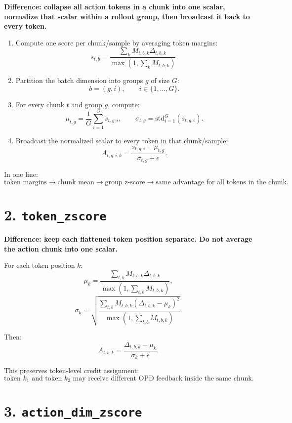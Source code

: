 \documentclass[10pt]{article}
\newcommand{\Diff}[1]{\textcolor{DiffBlue}{\textbf{#1}}}
\newcommand{\code}[1]{\texttt{#1}}
\newcommand{\Margin}{\Delta}
\newcommand{\Mask}{M}
\newcommand{\Adv}{A}
\begin{document}
\Diff{Difference: collapse all action tokens in a chunk into one scalar, normalize
that scalar within a rollout group, then broadcast it back to every token.}

\begin{enumerate}
  \item Compute one score per chunk/sample by averaging token margins:
  \[
    s_{t,b}
    =
    \frac{\sum_k \Mask_{t,b,k}\Margin_{t,b,k}}
         {\max\left(1,\sum_k \Mask_{t,b,k}\right)}.
  \]

  \item Partition the batch dimension into groups $g$ of size $G$:
  \[
    b=(g,i), \qquad i\in\{1,\ldots,G\}.
  \]

  \item For every chunk $t$ and group $g$, compute:
  \[
    \mu_{t,g} = \frac{1}{G}\sum_{i=1}^G s_{t,g,i},
    \qquad
    \sigma_{t,g}
    =
    \mathrm{std}_{i=1}^G(s_{t,g,i}).
  \]

  \item Broadcast the normalized scalar to every token in that chunk/sample:
  \[
    \Adv_{t,g,i,k}
    =
    \frac{s_{t,g,i}-\mu_{t,g}}{\sigma_{t,g}+\epsilon}.
  \]
\end{enumerate}

In one line:
\[
  \text{token margins}
  \rightarrow
  \text{chunk mean}
  \rightarrow
  \text{group z-score}
  \rightarrow
  \text{same advantage for all tokens in the chunk}.
\]

\section*{2. \code{token\_zscore}}

\Diff{Difference: keep each flattened token position separate. Do not average the
action chunk into one scalar.}

For each token position $k$:
\[
  \mu_k
  =
  \frac{\sum_{t,b}\Mask_{t,b,k}\Margin_{t,b,k}}
       {\max\left(1,\sum_{t,b}\Mask_{t,b,k}\right)},
\]
\[
  \sigma_k
  =
  \sqrt{
    \frac{\sum_{t,b}\Mask_{t,b,k}(\Margin_{t,b,k}-\mu_k)^2}
         {\max\left(1,\sum_{t,b}\Mask_{t,b,k}\right)}
  }.
\]

Then:
\[
  \Adv_{t,b,k}
  =
  \frac{\Margin_{t,b,k}-\mu_k}{\sigma_k+\epsilon}.
\]

This preserves token-level credit assignment:
\[
  \text{token } k_1 \text{ and token } k_2
  \text{ may receive different OPD feedback inside the same chunk.}
\]

\section*{3. \code{action\_dim\_zscore}}
\end{document}
